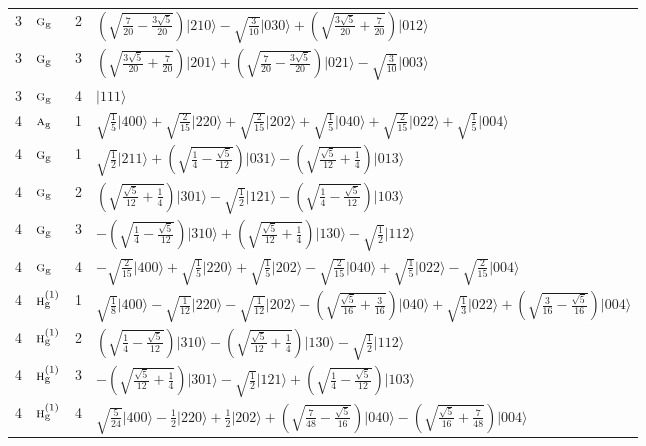 \documentclass[11pt]{article}
\newcommand{\irr}[1]{\text{\normalfont\scshape #1}}
\newcommand{\ptag}[1]{\mathrm{#1}}
\newcommand{\occ}[1]{\lvert #1\rangle}
\begin{document}
\begin{longtable}{c l c p{}}
3 & $\irr{g}_{\ptag{g}}$ & 2 & $(\sqrt{\frac{7}{20} - \frac{3 \sqrt{5}}{20}})\occ{210}-\sqrt{\tfrac{3}{10}}\occ{030}+(\sqrt{\frac{3 \sqrt{5}}{20} + \frac{7}{20}})\occ{012}$\\
3 & $\irr{g}_{\ptag{g}}$ & 3 & $(\sqrt{\frac{3 \sqrt{5}}{20} + \frac{7}{20}})\occ{201}+(\sqrt{\frac{7}{20} - \frac{3 \sqrt{5}}{20}})\occ{021}-\sqrt{\tfrac{3}{10}}\occ{003}$\\
3 & $\irr{g}_{\ptag{g}}$ & 4 & $\occ{111}$\\
\hline
4 & $\irr{a}_{\ptag{g}}$ & 1 & $\sqrt{\tfrac{1}{5}}\occ{400}+\sqrt{\tfrac{2}{15}}\occ{220}+\sqrt{\tfrac{2}{15}}\occ{202}+\sqrt{\tfrac{1}{5}}\occ{040}+\sqrt{\tfrac{2}{15}}\occ{022}+\sqrt{\tfrac{1}{5}}\occ{004}$\\
4 & $\irr{g}_{\ptag{g}}$ & 1 & $\sqrt{\tfrac{1}{2}}\occ{211}+(\sqrt{\frac{1}{4} - \frac{\sqrt{5}}{12}})\occ{031}-(\sqrt{\frac{\sqrt{5}}{12} + \frac{1}{4}})\occ{013}$\\
4 & $\irr{g}_{\ptag{g}}$ & 2 & $(\sqrt{\frac{\sqrt{5}}{12} + \frac{1}{4}})\occ{301}-\sqrt{\tfrac{1}{2}}\occ{121}-(\sqrt{\frac{1}{4} - \frac{\sqrt{5}}{12}})\occ{103}$\\
4 & $\irr{g}_{\ptag{g}}$ & 3 & $-(\sqrt{\frac{1}{4} - \frac{\sqrt{5}}{12}})\occ{310}+(\sqrt{\frac{\sqrt{5}}{12} + \frac{1}{4}})\occ{130}-\sqrt{\tfrac{1}{2}}\occ{112}$\\
4 & $\irr{g}_{\ptag{g}}$ & 4 & $-\sqrt{\tfrac{2}{15}}\occ{400}+\sqrt{\tfrac{1}{5}}\occ{220}+\sqrt{\tfrac{1}{5}}\occ{202}-\sqrt{\tfrac{2}{15}}\occ{040}+\sqrt{\tfrac{1}{5}}\occ{022}-\sqrt{\tfrac{2}{15}}\occ{004}$\\
4 & $\irr{h}_{\ptag{g}}^{(1)}$ & 1 & $\sqrt{\tfrac{1}{8}}\occ{400}-\sqrt{\tfrac{1}{12}}\occ{220}-\sqrt{\tfrac{1}{12}}\occ{202}-(\sqrt{\frac{\sqrt{5}}{16} + \frac{3}{16}})\occ{040}+\sqrt{\tfrac{1}{3}}\occ{022}+(\sqrt{\frac{3}{16} - \frac{\sqrt{5}}{16}})\occ{004}$\\
4 & $\irr{h}_{\ptag{g}}^{(1)}$ & 2 & $(\sqrt{\frac{1}{4} - \frac{\sqrt{5}}{12}})\occ{310}-(\sqrt{\frac{\sqrt{5}}{12} + \frac{1}{4}})\occ{130}-\sqrt{\tfrac{1}{2}}\occ{112}$\\
4 & $\irr{h}_{\ptag{g}}^{(1)}$ & 3 & $-(\sqrt{\frac{\sqrt{5}}{12} + \frac{1}{4}})\occ{301}-\sqrt{\tfrac{1}{2}}\occ{121}+(\sqrt{\frac{1}{4} - \frac{\sqrt{5}}{12}})\occ{103}$\\
4 & $\irr{h}_{\ptag{g}}^{(1)}$ & 4 & $\sqrt{\tfrac{5}{24}}\occ{400}-\tfrac{1}{2}\occ{220}+\tfrac{1}{2}\occ{202}+(\sqrt{\frac{7}{48} - \frac{\sqrt{5}}{16}})\occ{040}-(\sqrt{\frac{\sqrt{5}}{16} + \frac{7}{48}})\occ{004}$\\

\end{longtable}
\end{document}
